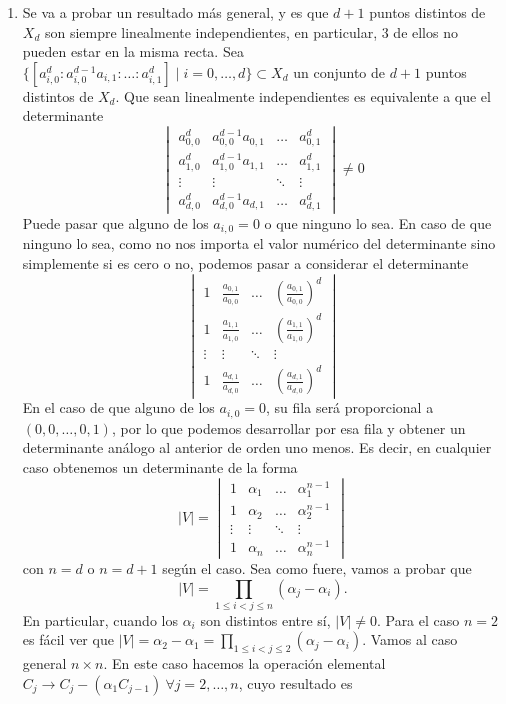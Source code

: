 \documentclass[twoside]{article}
\begin{document}
\begin{solucion}
\begin{enumerate}
\item Se va a probar un resultado más general, y es que $d+1$ puntos distintos de $X_d$ son siempre linealmente independientes, en particular, 3 de ellos no pueden estar en la misma recta. Sea $\{[a_{i,0}^d:a_{i,0}^{d-1}a_{i,1}:\dots:a_{i,1}^d]\mid i=0,\dots, d\}\subset X_d$ un conjunto de $d+1$ puntos distintos de $X_d$. Que sean linealmente independientes es equivalente a que el determinante
\[
\begin{vmatrix}
a_{0,0}^d&a_{0,0}^{d-1}a_{0,1}&\dots&a_{0,1}^d\\
a_{1,0}^d&a_{1,0}^{d-1}a_{1,1}&\dots&a_{1,1}^d\\
\vdots   &\vdots               &\ddots& \vdots\\
a_{d,0}^d&a_{d,0}^{d-1}a_{d,1}&\dots&a_{d,1}^d        
\end{vmatrix}\neq 0
\]
Puede pasar que alguno de los $a_{i,0}=0$ o que ninguno lo sea. En caso de que ninguno lo sea, como no nos importa el valor numérico del determinante sino simplemente si es cero o no, podemos pasar a considerar el determinante
\[
\begin{vmatrix}
1&\frac{a_{0,1}}{a_{0,0}}&\dots& \left(\frac{a_{0,1}}{a_{0,0}}\right)^d\\
1&\frac{a_{1,1}}{a_{1,0}}&\dots& \left(\frac{a_{1,1}}{a_{1,0}}\right)^d\\
\vdots   &\vdots               &\ddots& \vdots\\
1&\frac{a_{d,1}}{a_{d,0}}&\dots& \left(\frac{a_{d,1}}{a_{d,0}}\right)^d       
\end{vmatrix}
\]
En el caso de que alguno de los $a_{i,0}=0$, su fila será proporcional a $(0,0,\dots,0,1)$, por lo que podemos desarrollar por esa fila y obtener un determinante análogo al anterior de orden uno menos. Es decir, en cualquier caso obtenemos un determinante de la forma
\[
|V|=\begin{vmatrix}
1&\alpha_1&\dots& \alpha_1^{n-1}\\
1&\alpha_2&\dots& \alpha_2^{n-1}\\
\vdots   &\vdots               &\ddots& \vdots\\
1&\alpha_n&\dots& \alpha_n^{n-1}       
\end{vmatrix}
\] 
con $n=d$ o $n=d+1$ según el caso. Sea como fuere, vamos a probar que  $$|V|=\prod_{1\leq i<j\leq n}(\alpha_j-\alpha_i).$$ En particular, cuando los $\alpha_i$ son distintos entre sí, $|V|\neq 0$. Para el caso $n=2$ es fácil ver que $|V|=\alpha_2-\alpha_1=\prod_{1\le i<j\le 2} (\alpha_j-\alpha_i)$. Vamos al caso general $n\times n$. En este caso hacemos la operación elemental $C_j\rightarrow C_j-(\alpha_1 C_{j-1})\ \forall j=2,\dots, n$, cuyo resultado es

\end{enumerate}
\end{solucion}
\end{document}
